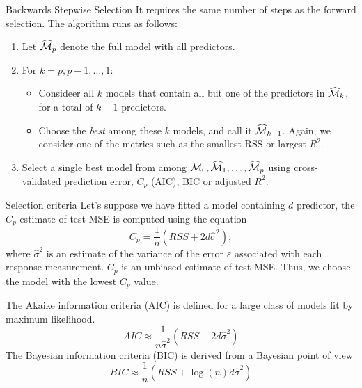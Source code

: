 \documentclass{beamer}
\begin{document}
\begin{frame}{Backwards Stepwise Selection}
	It requires the same number of steps as the forward selection. The algorithm runs as follows:
	
	\begin{enumerate}
		\item Let $\widehat{\cal M}_p$  denote the full model with all predictors.
		\item For $k=p,p-1,\ldots,1$:
		\begin{itemize}
			\item Consideer all $k$ models that contain all but one of the predictors in $\widehat{\cal M}_k$, for a total of $k-1$ predictors.
			\item Choose the {\it best} among these $k$ models, and call it $\widehat{\cal M}_{k-1}$. Again, we consider one of the metrics such as the smallest RSS or largest $R^2$.
		\end{itemize}
	 \item Select a single best model from among ${\cal M}_0,\widehat{\cal M}_1, \ldots, \widehat{\cal M}_p$ using cross-validated prediction error, $C_p$ (AIC), BIC or adjusted $R^2$.
	\end{enumerate}
\end{frame}

\begin{frame}{Selection criteria}
	Let's suppose we have fitted a model containing $d$ predictor, the $C_p$ estimate of test MSE is computed using the equation
	\begin{equation*}
		C_p= \frac{1}{n} (RSS+ 2d \hat{\sigma}^2),
	\end{equation*}
	where $\hat{\sigma}^2$ is an estimate of the variance of the error $\varepsilon$ associated with each response measurement. $C_p$ is an unbiased estimate of test MSE. Thus, we choose the model with the lowest $C_p$ value. 
	
	The Akaike information criteria (AIC) is defined for a large class of models fit by maximum likelihood. 
	\begin{equation*}
		AIC \approx \frac{1}{n \hat{\sigma}^2} (RSS+ 2d \hat{\sigma}^2)
	\end{equation*}
 The Bayesian information criteria (BIC) is derived from a Bayesian point of view
 \begin{equation*}
 	BIC \approx \frac{1}{n} (RSS+ \log(n)d \hat{\sigma}^2)
 \end{equation*}

\end{frame}
\end{document}
